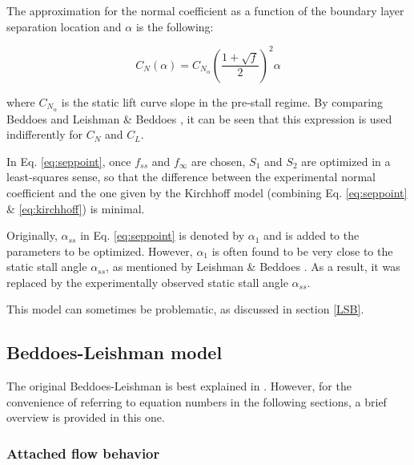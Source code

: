 The approximation for the normal coefficient as a function of the boundary layer separation location and $\alpha$ is the following: 

\begin{equation}
	C_N (\alpha) = C_ {N_{\alpha}} \left(\frac{1+\sqrt{f}}{2}\right)^2 \alpha
	\label{eq:kirchhoff}
\end{equation}

\noindent where $C_{N_\alpha}$ is the static lift curve slope in the pre-stall regime. By comparing Beddoes \cite{beddoes_representation_1983} and Leishman \& Beddoes \cite{leishman_semi-empirical_1989}, it can be seen that this expression is used indifferently for $C_N$ and $C_L$.

In Eq. \eqref{eq:seppoint}, once $f_{ss}$ and $f_\infty$ are chosen, $S_1$ and $S_2$ are optimized in a least-squares sense, so that the difference between the experimental normal coefficient and the one given by the Kirchhoff model (combining Eq. \eqref{eq:seppoint} \& \eqref{eq:kirchhoff}) is minimal.

Originally, $\alpha_{ss}$ in Eq. \ref{eq:seppoint} is denoted by $\alpha_1$ and is added to the parameters to be optimized. However, $\alpha_1$ is often found to be very close to the static stall angle $\alpha_{ss}$, as mentioned by Leishman \& Beddoes \cite{leishman_semi-empirical_1989}. As a result, it was replaced by the experimentally observed static stall angle $\alpha_{ss}$. 

This model can sometimes be problematic, as discussed in section \ref{LSB}.


\iffalse
\begin{tikzpicture}[
	nonterminal/.style={
		rectangle,
		minimumsize=6mm,
		very thick,
		draw=black,
		color=white,						
	}]
	\node [nonterminal] {\alpha}
\end{tikzpicture}
\fi

\subsection{Beddoes-Leishman model}

The original Beddoes-Leishman is best explained in \cite{tank_possibility_2017}. However, for the convenience of referring to equation numbers in the following sections, a brief overview is provided in this one. 

\subsubsection{Attached flow behavior}

